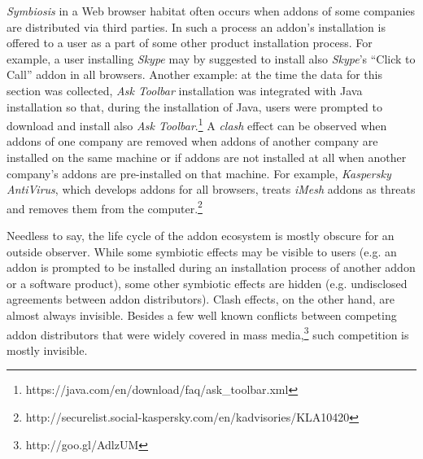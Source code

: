 \documentclass[10pt,letterpaper]{article}
\begin{document}
 \emph{Symbiosis} in a Web browser habitat often occurs when addons of some companies are distributed via third parties. In such a process an addon's installation is offered to a user as a part of some other product installation process. For example, a user installing \textit{Skype} may by suggested to install also \textit{Skype}'s ``Click to Call'' addon in all browsers. Another example: at the time the data for this section was collected, \textit{Ask Toolbar} installation was integrated with Java installation so that, during the installation of Java, users were prompted to download and install also \textit{Ask Toolbar}.\footnote{ https://java.com/en/download/faq/ask\_toolbar.xml} A \emph{clash} effect can be observed when addons of one company are removed when addons of another company are installed on the same machine or if addons are not installed at all when another company's addons are pre-installed on that machine. For example, \textit{Kaspersky AntiVirus}, which develops addons for all browsers, treats \textit{iMesh} addons as threats and removes them from the computer.\footnote{ http://securelist.social-kaspersky.com/en/kadvisories/KLA10420} 

Needless to say, the life cycle of the addon ecosystem is mostly obscure for an outside observer. While some symbiotic effects may be visible to users (e.g. an addon is prompted to be installed during an installation process of another addon or a software product), some other symbiotic effects are hidden (e.g. undisclosed agreements between addon distributors). Clash effects, on the other hand, are almost always invisible. Besides a few well known conflicts between competing addon distributors that were widely covered in mass media,\footnote{ http://goo.gl/AdlzUM} such competition is mostly invisible. 
\end{document}
